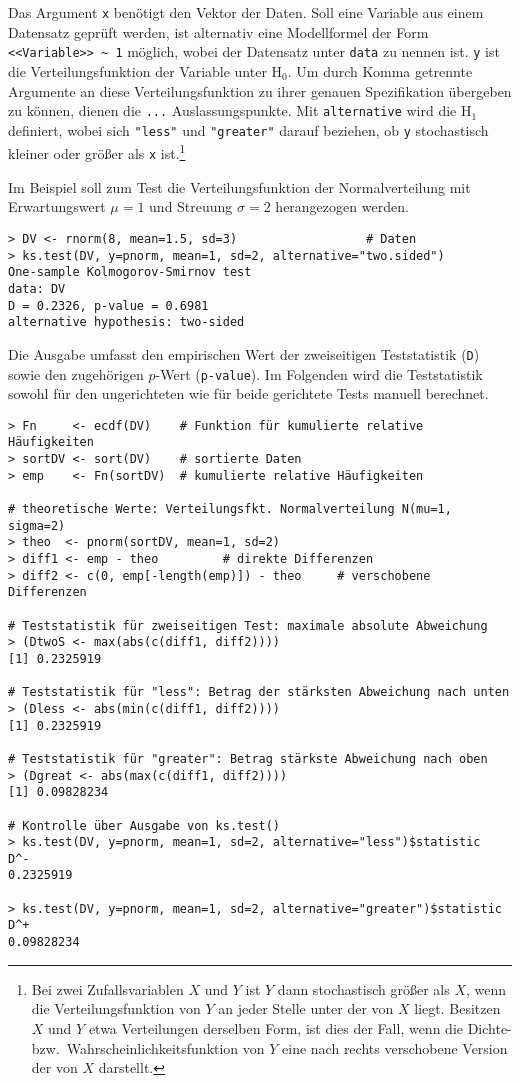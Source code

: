 Das Argument \lstinline!x! benötigt den Vektor der Daten. Soll eine Variable aus einem Datensatz geprüft werden, ist alternativ eine Modellformel der Form \lstinline!<<Variable>> ~ 1! möglich, wobei der Datensatz unter \lstinline!data! zu nennen ist. \lstinline!y! ist die Verteilungsfunktion der Variable unter $\text{H}_{0}$. Um durch Komma getrennte Argumente an diese Verteilungsfunktion zu ihrer genauen Spezifikation übergeben zu können, dienen die \lstinline!...! Auslassungspunkte. Mit \lstinline!alternative! wird die $\text{H}_{1}$ definiert, wobei sich \lstinline!"less"! und \lstinline!"greater"! darauf beziehen, ob \lstinline!y! stochastisch kleiner oder größer als \lstinline!x! ist.\footnote{\label{ftn:stochDom}Bei zwei Zufallsvariablen $X$ und $Y$ ist $Y$ dann stochastisch größer als $X$, wenn die Verteilungsfunktion von $Y$ an jeder Stelle unter der von $X$ liegt. Besitzen $X$ und $Y$ etwa Verteilungen derselben Form, ist dies der Fall, wenn die Dichte- bzw.\ Wahrscheinlichkeitsfunktion von $Y$ eine nach rechts verschobene Version der von $X$ darstellt.}

Im Beispiel soll zum Test die Verteilungsfunktion der Normalverteilung mit Erwartungswert $\mu=1$ und Streuung $\sigma=2$ herangezogen werden.
\begin{lstlisting}
> DV <- rnorm(8, mean=1.5, sd=3)                  # Daten
> ks.test(DV, y=pnorm, mean=1, sd=2, alternative="two.sided")
One-sample Kolmogorov-Smirnov test
data: DV
D = 0.2326, p-value = 0.6981
alternative hypothesis: two-sided
\end{lstlisting}

Die Ausgabe umfasst den empirischen Wert der zweiseitigen Teststatistik (\lstinline!D!) sowie den zugehörigen $p$-Wert (\lstinline!p-value!). Im Folgenden wird die Teststatistik sowohl für den ungerichteten wie für beide gerichtete Tests manuell berechnet.
\begin{lstlisting}
> Fn     <- ecdf(DV)    # Funktion für kumulierte relative Häufigkeiten
> sortDV <- sort(DV)    # sortierte Daten
> emp    <- Fn(sortDV)  # kumulierte relative Häufigkeiten

# theoretische Werte: Verteilungsfkt. Normalverteilung N(mu=1, sigma=2)
> theo  <- pnorm(sortDV, mean=1, sd=2)
> diff1 <- emp - theo         # direkte Differenzen
> diff2 <- c(0, emp[-length(emp)]) - theo     # verschobene Differenzen

# Teststatistik für zweiseitigen Test: maximale absolute Abweichung
> (DtwoS <- max(abs(c(diff1, diff2))))
[1] 0.2325919

# Teststatistik für "less": Betrag der stärksten Abweichung nach unten
> (Dless <- abs(min(c(diff1, diff2))))
[1] 0.2325919

# Teststatistik für "greater": Betrag stärkste Abweichung nach oben
> (Dgreat <- abs(max(c(diff1, diff2))))
[1] 0.09828234

# Kontrolle über Ausgabe von ks.test()
> ks.test(DV, y=pnorm, mean=1, sd=2, alternative="less")$statistic
D^-
0.2325919

> ks.test(DV, y=pnorm, mean=1, sd=2, alternative="greater")$statistic
D^+
0.09828234
\end{lstlisting}

